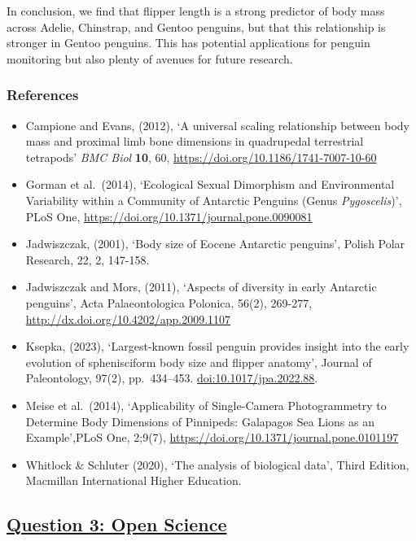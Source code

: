 \documentclass[
]{article}
\begin{document}
In conclusion, we find that flipper length is a strong predictor of body
mass across Adelie, Chinstrap, and Gentoo penguins, but that this
relationship is stronger in Gentoo penguins. This has potential
applications for penguin monitoring but also plenty of avenues for
future research.

\subsubsection{References}\label{references}

\begin{itemize}
\item
  Campione and Evans, (2012), `A universal scaling relationship between
  body mass and proximal limb bone dimensions in quadrupedal terrestrial
  tetrapods' \emph{BMC Biol} \textbf{10}, 60,
  \url{https://doi.org/10.1186/1741-7007-10-60}
\item
  Gorman et al.~(2014), `Ecological Sexual Dimorphism and Environmental
  Variability within a Community of Antarctic Penguins (Genus
  \emph{Pygoscelis})', PLoS One,
  \url{https://doi.org/10.1371/journal.pone.0090081}
\item
  Jadwiszczak, (2001), `Body size of Eocene Antarctic penguins', Polish
  Polar Research, 22, 2, 147-158.
\item
  Jadwiszczak and Mors, (2011), `Aspects of diversity in early Antarctic
  penguins', Acta Palaeontologica Polonica, 56(2), 269-277,
  \url{http://dx.doi.org/10.4202/app.2009.1107}
\item
  Ksepka, (2023), `Largest-known fossil penguin provides insight into
  the early evolution of sphenisciform body size and flipper anatomy',
  Journal of Paleontology, 97(2), pp.~434--453.
  \url{doi:10.1017/jpa.2022.88}.
\item
  Meise et al.~(2014), `Applicability of Single-Camera Photogrammetry to
  Determine Body Dimensions of Pinnipeds: Galapagos Sea Lions as an
  Example',PLoS One, 2;9(7),
  \url{https://doi.org/10.1371/journal.pone.0101197}
\item
  Whitlock \& Schluter (2020), `The analysis of biological data', Third
  Edition, Macmillan International Higher Education.
\end{itemize}

\subsection{\texorpdfstring{\ul{Question 3: Open
Science}}{Question 3: Open Science}}\label{question-3-open-science}
\end{document}
